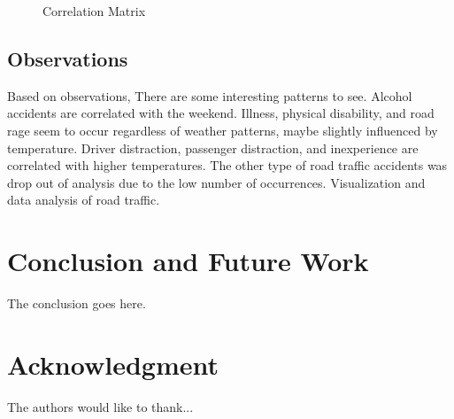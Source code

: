 \documentclass[conference]{IEEEtran}
\begin{document}
\begin{figure}[bth]
	\centering
	\caption{Correlation Matrix}
	\label{fig:cormap}
\end{figure}

\subsection{Observations}
Based on observations, There are some interesting patterns to see. Alcohol accidents are correlated with the weekend. Illness, physical disability, and road rage seem to occur regardless of weather patterns, maybe slightly influenced by temperature. Driver distraction, passenger distraction, and inexperience are correlated with higher temperatures. The other type of road traffic accidents was drop out of analysis due to the low number of occurrences. Visualization and data analysis of road traffic. 
\section{Conclusion and Future Work}
The conclusion goes here.






\section*{Acknowledgment}
The authors would like to thank...



{\small}
 
\end{document}

